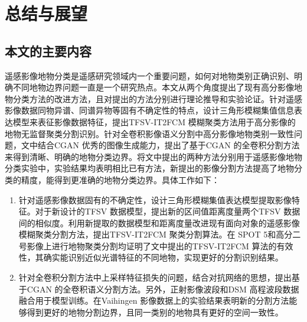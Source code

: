 
\chapter{总结与展望}
\label{cha:chap05}

\section{本文的主要内容}
\label{sec:5-1}
遥感影像地物分类是遥感研究领域内一个重要问题，如何对地物类别正确识别、明确不同地物边界问题一直是一个研究热点。本文从两个角度提出了现有高分影像地物分类方法的改进方法，且对提出的方法分别进行理论推导和实验论证。针对遥感影像数据同物异谱、同谱异物等固有不确定性的特点，设计三角形模糊集值信息表达模型来表征影像数据特征，提出TFSV-IT2FCM 模糊聚类方法用于高分影像的地物无监督聚类分割识别。针对全卷积影像语义分割中高分影像地物类别一致性问题，文中结合CGAN 优秀的图像生成能力，提出了基于CGAN 的全卷积分割方法来得到清晰、明确的地物分类边界。将文中提出的两种方法分别用于遥感影像地物分类实验中，实验结果均表明相比已有方法，新提出的影像分割方法提高了地物分类的精度，能得到更准确的地物分类边界。具体工作如下：
\begin{enumerate}[(1)]
  \item 针对遥感影像数据固有的不确定性，设计三角形模糊集值表达模型提取影像特征。对于新设计的TFSV 数据模型，提出新的区间值距离度量两个TFSV 数据间的相似度。利用新提取的数据模型和距离度量改进现有面向对象的遥感影像模糊聚类分割方法，提出TFSV-IT2FCM 聚类分割算法。在 SPOT 5和高分二号影像上进行地物聚类分割均证明了文中提出的TFSV-IT2FCM 算法的有效性，其确实能识别近似光谱特征的不同地物，实现更好的分割识别结果。
  \item 针对全卷积分割方法中上采样特征损失的问题，结合对抗网络的思想，提出基于CGAN 的全卷积语义分割方法。另外，正射影像波段和DSM 高程波段数据融合用于模型训练。在Vaihingen 影像数据上的实验结果表明新的分割方法能够得到更好的地物分割边界，且同一类别的地物具有更好的空间一致性。
\end{enumerate}


